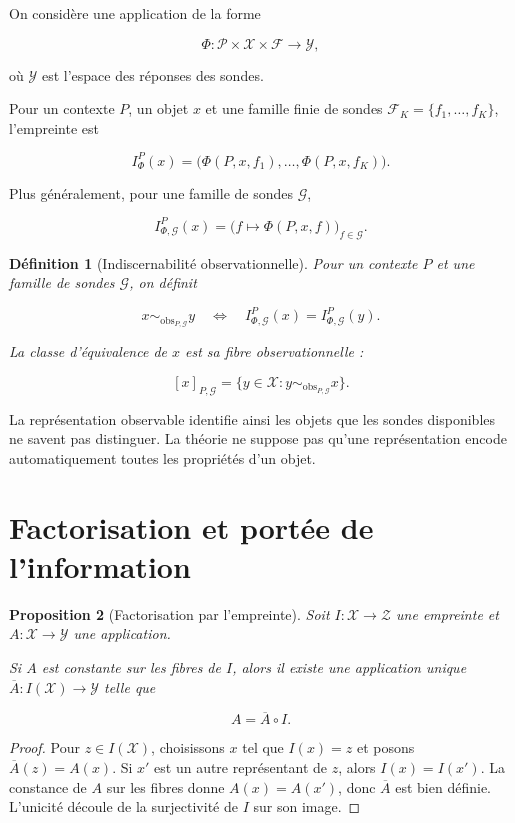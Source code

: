 \documentclass[11pt,a4paper,oneside]{book}
\newtheorem{definition}{Définition}[chapter]
\newtheorem{proposition}[definition]{Proposition}
\theoremstyle{remark}
\newcommand{\ObsRel}{\sim_{\mathrm{obs}}}
\begin{document}
On considère une application de la forme

\[
\Phi:\mathcal{P}\times\mathcal{X}\times\mathcal{F}
\longrightarrow \mathcal{Y},
\]

où \(\mathcal{Y}\) est l'espace des réponses des sondes.

Pour un contexte \(P\), un objet \(x\) et une famille finie de sondes
\(\mathcal{F}_K=\{f_1,\ldots,f_K\}\), l'empreinte est

\[
I_\Phi^P(x)
=
\bigl(
\Phi(P,x,f_1),\ldots,\Phi(P,x,f_K)
\bigr).
\]

Plus généralement, pour une famille de sondes \(\mathcal{G}\),

\[
I_{\Phi,\mathcal{G}}^P(x)
=
\bigl(f\mapsto \Phi(P,x,f)\bigr)_{f\in\mathcal{G}}.
\]

\begin{definition}[Indiscernabilité observationnelle]
Pour un contexte \(P\) et une famille de sondes \(\mathcal{G}\),
on définit

\[
x\ObsRel_{P,\mathcal{G}} y
\quad\Longleftrightarrow\quad
I_{\Phi,\mathcal{G}}^P(x)
=
I_{\Phi,\mathcal{G}}^P(y).
\]

La classe d'équivalence de \(x\) est sa fibre observationnelle :

\[
[x]_{P,\mathcal{G}}
=
\{y\in\mathcal{X}:y\ObsRel_{P,\mathcal{G}}x\}.
\]
\end{definition}

La représentation observable identifie ainsi les objets que les
sondes disponibles ne savent pas distinguer. La théorie ne suppose
pas qu'une représentation encode automatiquement toutes les
propriétés d'un objet.

\section{Factorisation et portée de l'information}

\begin{proposition}[Factorisation par l'empreinte]
Soit \(I:\mathcal{X}\to\mathcal{Z}\) une empreinte et
\(A:\mathcal{X}\to\mathcal{Y}\) une application.

Si \(A\) est constante sur les fibres de \(I\), alors il existe une
application unique
\(\overline{A}:I(\mathcal{X})\to\mathcal{Y}\) telle que

\[
A=\overline{A}\circ I.
\]

\end{proposition}

\begin{proof}
Pour \(z\in I(\mathcal{X})\), choisissons \(x\) tel que \(I(x)=z\)
et posons \(\overline{A}(z)=A(x)\). Si \(x'\) est un autre représentant
de \(z\), alors \(I(x)=I(x')\). La constance de \(A\) sur les fibres
donne \(A(x)=A(x')\), donc \(\overline{A}\) est bien définie.
L'unicité découle de la surjectivité de \(I\) sur son image.
\end{proof}
\end{document}
